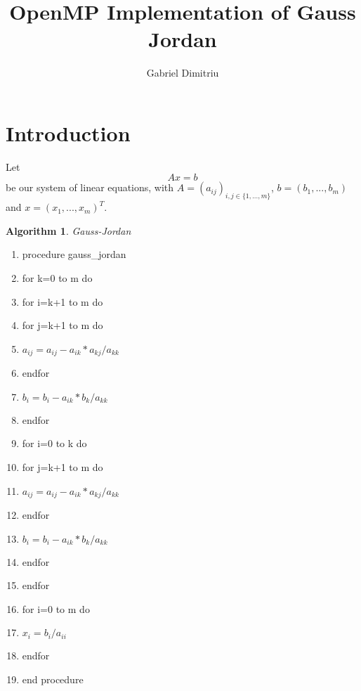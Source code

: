 \documentclass[a4paper]{article}
\newtheorem{algorithm}[theorem]{Algorithm}
\begin{document}
\title{OpenMP Implementation of Gauss Jordan}
\date{}
\author{Gabriel Dimitriu}
\maketitle

\section{Introduction}

Let 
\begin{equation}
Ax=b  \label{s1}
\end{equation}%
be our system of linear equations, with $A=(a_{ij})_{i,j\in \{1,...,m\}}$, $%
b=(b_{1},...,b_{m})$ and $x=(x_{1},...,x_{m})^{T}$.

\begin{algorithm}
Gauss-Jordan
\end{algorithm}

\begin{enumerate}
\item procedure gauss\_jordan

\item for k=0 to m do

\item \qquad for i=k+1 to m do

\item \qquad \qquad for j=k+1 to m do

\item \qquad \qquad \qquad $a_{ij}=a_{ij}-a_{ik}\ast a_{kj}/a_{kk}$

\item \qquad \qquad endfor

\item \qquad \qquad $b_{i}=b_{i}-a_{ik}\ast b_{k}/a_{kk}$

\item \qquad endfor

\item \qquad for i=0 to k do

\item \qquad \qquad for j=k+1 to m do

\item \qquad \qquad \qquad $a_{ij}=a_{ij}-a_{ik}\ast a_{kj}/a_{kk}$

\item \qquad \qquad endfor

\item \qquad \qquad $b_{i}=b_{i}-a_{ik}\ast b_{k}/a_{kk}$

\item \qquad endfor

\item endfor

\item for i=0 to m do

\item \qquad $x_{i}=b_{i}/a_{ii}$

\item endfor

\item end procedure
\end{enumerate}
\end{document}
